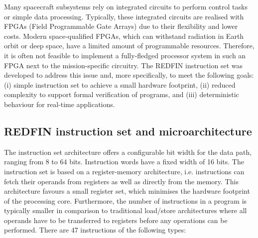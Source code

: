 
Many spacecraft subsystems rely on integrated circuits to perform control tasks
or simple data processing. Typically, these integrated circuits are realised
with FPGAs (Field Programmable Gate Arrays) due to their flexibility and lower
costs. Modern space-qualified FPGAs, which can withstand radiation in Earth
orbit or deep space, have a limited amount of programmable resources. Therefore,
it is often not feasible to implement a fully-fledged processor system in such
an FPGA next to the mission-specific circuitry.
The REDFIN instruction set was developed to address this issue and, more
specifically, to meet the following goals: (i) simple instruction set to
achieve a small hardware footprint, (ii) reduced complexity to support formal
verification of programs, and (iii) deterministic behaviour for real-time
applications.

\subsection{REDFIN instruction set and microarchitecture}


The instruction set architecture offers a configurable bit width for the
data path, ranging from 8 to 64 bits. Instruction words have a fixed width of 16
bits. The instruction set is based on a register-memory architecture, i.e.
instructions can fetch their operands from registers as well as directly from the
memory. This architecture favours a small register set, which minimises the hardware
footprint of the processing core. Furthermore, the number of instructions in a
program is typically smaller in comparison to traditional load/store architectures
where all operands have to be transferred to registers before any operations can
be performed. There are 47 instructions of the following types:

